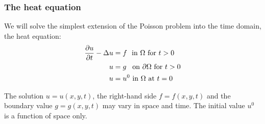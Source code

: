 \begin{frame}
  \frametitle{The heat equation}


  We will solve the simplest extension of the Poisson problem into the
  time domain, the heat equation:
  \begin{align*}
    \frac{\partial u}{\partial t} - \Delta u &= f \,\,\mbox{ in } \Omega \hbox{ for } t>0
    \\
    u &= g \,\,\,\mbox{ on } \partial \Omega\hbox{ for } t>0
    \\
    u &= u^0 \mbox{ in } \Omega \mbox{ at } t=0
  \end{align*}

  The solution $u = u(x, y, t)$, the right-hand side $f = f(x, y, t)$ and
  the boundary value $g = g(x, y, t)$ may vary in space and time.
  The initial value $u^0$ is a function of space only.

\end{frame}
